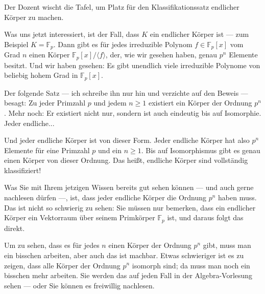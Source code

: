 \begin{meta-note}[Tafelreinigung]
Der Dozent wischt die Tafel, um Platz für den Klassifikationssatz endlicher Körper zu machen.
\end{meta-note}

\begin{spoken-clean}[01:05:39 - 01:08:19]
Was uns jetzt interessiert, ist der Fall, dass $K$ ein endlicher Körper ist --- zum Beispiel $K = \mathbb{F}_p$. Dann gibt es für jedes irreduzible Polynom $f \in \mathbb{F}_p[x]$ vom Grad $n$ einen Körper $\mathbb{F}_p[x]/\langle f \rangle$, der, wie wir gesehen haben, genau $p^n$ Elemente besitzt. Und wir haben gesehen: Es gibt unendlich viele irreduzible Polynome von beliebig hohem Grad in $\mathbb{F}_p[x]$.

Der folgende Satz --- ich schreibe ihn nur hin und verzichte auf den Beweis --- besagt: Zu jeder Primzahl $p$ und jedem $n \ge 1$ existiert ein Körper der Ordnung $p^n$. Mehr noch: Er existiert nicht nur, sondern ist auch eindeutig bis auf Isomorphie. Jeder endliche...
\end{spoken-clean}

\begin{math-stroke}

\end{math-stroke}

\begin{spoken-clean}[01:08:19 - 01:11:09]
Und jeder endliche Körper ist von dieser Form. Jeder endliche Körper hat also $p^n$ Elemente für eine Primzahl $p$ und ein $n \ge 1$. Bis auf Isomorphismus gibt es genau einen Körper von dieser Ordnung. Das heißt, endliche Körper sind vollständig klassifiziert!

Was Sie mit Ihrem jetzigen Wissen bereits gut sehen können --- und auch gerne nachlesen dürfen ---, ist, dass jeder endliche Körper die Ordnung $p^n$ haben muss. Das ist nicht so schwierig zu sehen: Sie müssen nur bemerken, dass ein endlicher Körper ein Vektorraum über seinem Primkörper $\mathbb{F}_p$ ist, und daraus folgt das direkt.

Um zu sehen, dass es für jedes $n$ einen Körper der Ordnung $p^n$ gibt, muss man ein bisschen arbeiten, aber auch das ist machbar. Etwas schwieriger ist es zu zeigen, dass alle Körper der Ordnung $p^n$ isomorph sind; da muss man noch ein bisschen mehr arbeiten. Sie werden das auf jeden Fall in der Algebra-Vorlesung sehen --- oder Sie können es freiwillig nachlesen.
\end{spoken-clean}

